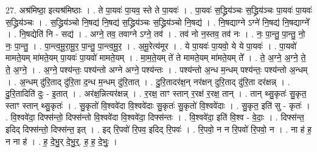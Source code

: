 \documentclass[17pt]{extarticle}
\begin{document}
27. अश्र॑मिष्ठा॒ इत्यश्र॑मिष्ठाः । . ते पा॒यवः॑ पा॒यव॒ स्ते ते पा॒यवः॑ । . पा॒यवः॑ स॒द्ध्रिय॑ञ्चः स॒द्ध्रिय॑ञ्चः पा॒यवः॑ पा॒यवः॑ स॒द्ध्रिय॑ञ्चः । . स॒द्ध्रिय॑ञ्चो नि॒षद्य॑ नि॒षद्य॑ स॒द्ध्रिय॑ञ्चः स॒द्ध्रिय॑ञ्चो नि॒षद्य॑ । . नि॒षद्याग्ने ऽग्ने॑ नि॒षद्य॑ नि॒षद्याग्ने᳚ । . नि॒षद्येति॑ नि - सद्य॑ । . अग्ने॒ तव॒ तवाग्ने ऽग्ने॒ तव॑ । . तव॑ नो न॒स्तव॒ तव॑ नः । . नः॒ पा॒न्तु॒ पा॒न्तु॒ नो॒ नः॒ पा॒न्तु॒ । . पा॒न्त्व॒मू॒रा॒मू॒र॒ पा॒न्तु॒ पा॒न्त्व॒मू॒र॒ । . अ॒मू॒रेत्य॑मूर । . ये पा॒यवः॑ पा॒यवो॒ ये ये पा॒यवः॑ । . पा॒यवो॑ मामते॒यम् मा॑मते॒यम् पा॒यवः॑ पा॒यवो॑ मामते॒यम् । . मा॒म॒ते॒यम् ते॑ ते मामते॒यम् मा॑मते॒यम् ते᳚ । . ते॒ अ॒ग्ने॒ अ॒ग्ने॒ ते॒ ते॒ अ॒ग्ने॒ । . अ॒ग्ने॒ पश्य॑न्तः॒ पश्य॑न्तो अग्ने अग्ने॒ पश्य॑न्तः । . पश्य॑न्तो अ॒न्ध म॒न्धम् पश्य॑न्तः॒ पश्य॑न्तो अ॒न्धम् । . अ॒न्धम् दु॑रि॒ताद् दु॑रि॒ता द॒न्ध म॒न्धम् दु॑रि॒तात् । . दु॒रि॒तादर॑क्ष॒न् नर॑क्षन् दुरि॒ताद् दु॑रि॒ता दर॑क्षन्न् । . दु॒रि॒तादिति॑ दुः - इ॒तात् । . अर॑क्ष॒न्नित्यर॑क्षन्न् । . र॒रक्ष॒ ताꣳ स्तान् र॒रक्ष॑ र॒रक्ष॒ तान् । . तान् थ्सु॒कृतः॑ सु॒कृत॒ स्ताꣳ स्तान् थ्सु॒कृतः॑ । . सु॒कृतो॑ वि॒श्ववे॑दा वि॒श्ववे॑दाः सु॒कृतः॑ सु॒कृतो॑ वि॒श्ववे॑दाः । . सु॒कृत॒ इति॑ सु - कृतः॑ । . वि॒श्ववे॑दा॒ दिफ्स॑न्तो॒ दिफ्स॑न्तो वि॒श्ववे॑दा वि॒श्ववे॑दा॒ दिफ्स॑न्तः । . वि॒श्ववे॑दा॒ इति॑ वि॒श्व - वे॒दाः॒ । . दिफ्स॑न्त॒ इदिद् दिफ्स॑न्तो॒ दिफ्स॑न्त॒ इत् । . इद् रि॒पवो॑ रि॒पव॒ इदिद् रि॒पवः॑ । . रि॒पवो॒ न न रि॒पवो॑ रि॒पवो॒ न । . ना ह॑ ह॒ न ना ह॑ । . ह॒ दे॒भु॒र् दे॒भु॒र्॒. ह॒ ह॒ दे॒भुः॒ । \newline
\end{document}
